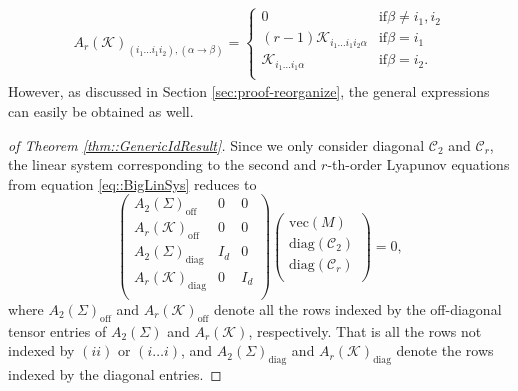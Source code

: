 \documentclass{biometrika}
\begin{document}
\begin{align}
\label{eq::A3KEntries}
        A_r(\mathcal{K} )_{(i_1 \dots i_1 i_2), (\alpha \rightarrow \beta)} = \begin{cases}
        0 & \mathrm{ if } \beta  \neq i_1, i_2\\
         (r-1) \mathcal{K} _{i_1 \dots i_1 i_2 \alpha} & \mathrm{ if } \beta = i_1\\
        \mathcal{K} _{i_1 \dots i_1 \alpha } & \mathrm{ if } \beta = i_2. \\
    \end{cases}
\end{align}
However, as discussed in Section \ref{sec:proof-reorganize}, the general expressions can easily be obtained as well. 

\begin{proof}[of Theorem \ref{thm::GenericIdResult}]

    Since we only consider diagonal $\mathcal{C}_2$ and $\mathcal{C}_r$, the linear system corresponding to the second and $r$-th-order Lyapunov equations from equation \eqref{eq::BigLinSys} reduces to 
    \begin{equation}
    \label{eq::ThmEquationSys}
        \begin{pmatrix}
            A_2(\Sigma)_{\mathrm{off}} & 0 & 0 \\ 
            A_r(\mathcal{K} )_{\mathrm{off}} & 0 & 0 \\
            A_2(\Sigma)_{\mathrm{diag}} & I_{d} & 0 \\
            A_r(\mathcal{K} )_{\mathrm{diag}} & 0 & I_{d} \\ 
        \end{pmatrix} 
        \begin{pmatrix}
            \mathrm{vec}(M) \\
            \mathrm{diag}(\mathcal{C}_2 )\\
             \mathrm{diag}(\mathcal{C}_r)\\
        \end{pmatrix}
         = 0,
    \end{equation}
    where $A_2(\Sigma)_{\mathrm{off}}$ and $A_r(\mathcal{K} )_{\mathrm{off}}$ denote all the rows indexed by the off-diagonal tensor entries of $A_2(\Sigma)$ and $A_r(\mathcal{K} )$, respectively. That is all the rows not indexed by $(ii)$ or $(i \dots i)$, and  $A_2(\Sigma)_{\mathrm{diag}}$ and $A_r(\mathcal{K} )_{\mathrm{diag}}$ denote the rows indexed by the diagonal entries. 
    

\end{proof}
\end{document}

